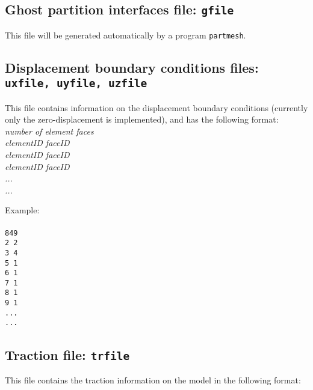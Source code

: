 \subsection{Ghost partition interfaces file: \texttt{gfile}}


This file will be generated automatically by a program \texttt{partmesh}.\\

\subsection{Displacement boundary conditions files: \texttt{uxfile, uyfile, uzfile}}

This file contains information on the displacement boundary conditions (currently only the zero-displacement is implemented), and has the following format:\\

\emph{number of element faces}\\
\emph{elementID faceID \\
elementID faceID \\
elementID faceID \\
...\\
...\\}

Example:\\
\\
\texttt{849\\
2 2\\
3 4\\
5 1\\
6 1\\
7 1\\
8 1\\
9 1\\
...\\
...}\\

\subsection{Traction file: \texttt{trfile}}

This file contains the traction information on the model in the following format:\\

